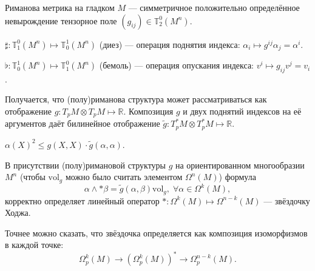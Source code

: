 \begin{to_def}
 	Риманова метрика на гладком $M$ --- симметричное положительно определённое невырождение тензорное поле $(g_{i j}) \in \mathbb{T}_2^0(M^n)$. 
 \end{to_def}

 \begin{to_def}
 	$\sharp \colon \mathbb{T}_1^0(M^n) \mapsto \mathbb{T}_0^1(M^n)$ (диез) --- операция поднятия индекса: $\alpha_i \mapsto g^{i j} \alpha_j = \alpha^i$.
 \end{to_def}

 \begin{to_def}
 	$\flat \colon \mathbb{T}^1_0(M^n) \mapsto \mathbb{T}^0_1(M^n)$ (бемоль) --- операция опускания индекса: $v^i \mapsto g_{i j}v^j = v_i$.
 \end{to_def}

Получается, что (полу)риманова структура может рассматриваться как отображение $g\colon T_pM \otimes T_pM \mapsto \mathbb{R}$.
Композиция $g$ и двух поднятий индексов на её аргументов даёт билинейное отображение $\tilde{g}\colon T_p^*M \otimes T_p^*M \mapsto \mathbb{R}$. 

\begin{to_tas}
	$\alpha(X)^2 \leq g(X,X) \cdot \tilde{g} (\alpha,\alpha)$.
\end{to_tas}

\begin{to_def}
	В присутствии (полу)римановой структуры $g$ на ориентированном многообразии $M^n$ (чтобы $\text{vol}_{g}$ можно было считать элементом $\Omega^n(M)$) формула 
	\begin{equation*}
		\alpha \wedge *\beta = \tilde{g}(\alpha,\beta) \text{vol}_g, \; \forall \alpha \in \Omega^k(M),	
	\end{equation*}
	корректно определяет линейный оператор $*\colon \Omega^k(M) \mapsto \Omega^{n-k}(M)$ --- звёздочку Ходжа.

	Точнее можно сказать, что звёздочка определяется как композиция изоморфизмов в каждой точке:
	\begin{equation*}
		\Omega_p^k(M) \longrightarrow \left(\Omega_p^k(M)\right)^* \longrightarrow \Omega_p^{n-k}(M).
	\end{equation*}
\end{to_def}